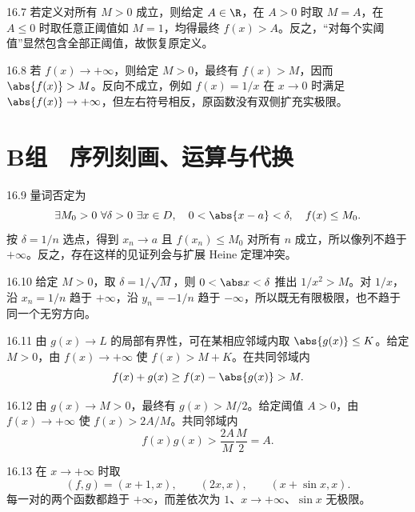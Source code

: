 \begin{solution}{16.7}
若定义对所有 \(M>0\) 成立，则给定 \(A\in\R\)，在 \(A>0\) 时取 \(M=A\)，在 \(A\le0\) 时取任意正阈值如 \(M=1\)，均得最终 \(f(x)>A\)。反之，“对每个实阈值”显然包含全部正阈值，故恢复原定义。
\end{solution}

\begin{solution}{16.8}
若 \(f(x)\to+\infty\)，则给定 \(M>0\)，最终有 \(f(x)>M\)，因而 \(\abs{f(x)}>M\)。反向不成立，例如 \(f(x)=1/x\) 在 \(x\to0\) 时满足 \(\abs{f(x)}\to+\infty\)，但左右符号相反，原函数没有双侧扩充实极限。
\end{solution}

\section*{B组　序列刻画、运算与代换}

\begin{solution}{16.9}
量词否定为
\[
 \exists M_0>0\ \forall\delta>0\ \exists x\in D,\quad
 0<\abs{x-a}<\delta,\quad f(x)\le M_0.
\]
按 \(\delta=1/n\) 选点，得到 \(x_n\to a\) 且 \(f(x_n)\le M_0\) 对所有 \(n\) 成立，所以像列不趋于 \(+\infty\)。反之，存在这样的见证列会与扩展 Heine 定理冲突。
\end{solution}

\begin{solution}{16.10}
给定 \(M>0\)，取 \(\delta=1/\sqrt M\)，则 \(0<\abs x<\delta\) 推出 \(1/x^2>M\)。对 \(1/x\)，沿 \(x_n=1/n\) 趋于 \(+\infty\)，沿 \(y_n=-1/n\) 趋于 \(-\infty\)，所以既无有限极限，也不趋于同一个无穷方向。
\end{solution}

\begin{solution}{16.11}
由 \(g(x)\to L\) 的局部有界性，可在某相应邻域内取 \(\abs{g(x)}\le K\)。给定 \(M>0\)，由 \(f(x)\to+\infty\) 使 \(f(x)>M+K\)。在共同邻域内
\[
 f(x)+g(x)\ge f(x)-\abs{g(x)}>M.
\]
\end{solution}

\begin{solution}{16.12}
由 \(g(x)\to M>0\)，最终有 \(g(x)>M/2\)。给定阈值 \(A>0\)，由 \(f(x)\to+\infty\) 使 \(f(x)>2A/M\)。共同邻域内
\[
 f(x)g(x)>\frac{2A}{M}\frac M2=A.
\]
\end{solution}

\begin{solution}{16.13}
在 \(x\to+\infty\) 时取
\[
 (f,g)=(x+1,x),\qquad (2x,x),\qquad
 (x+\sin x,x).
\]
每一对的两个函数都趋于 \(+\infty\)，而差依次为 \(1\)、\(x\to+\infty\)、\(\sin x\) 无极限。
\end{solution}

